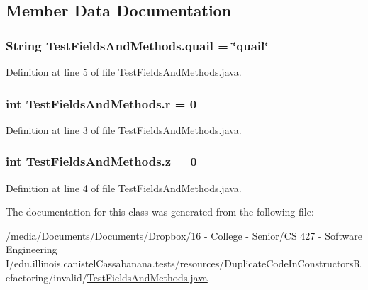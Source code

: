 \subsection{Member Data Documentation}
\hypertarget{classTestFieldsAndMethods_ac4d089475c4081e9840de7180babfb55}{
\subsubsection[{quail}]{\setlength{\rightskip}{0pt plus 5cm}String {\bf TestFieldsAndMethods.quail} = \char`\"{}quail\char`\"{}}}
\label{classTestFieldsAndMethods_ac4d089475c4081e9840de7180babfb55}


Definition at line 5 of file TestFieldsAndMethods.java.

\hypertarget{classTestFieldsAndMethods_a0d6af3a3e13ad181f3da6064c318534c}{
\subsubsection[{r}]{\setlength{\rightskip}{0pt plus 5cm}int {\bf TestFieldsAndMethods.r} = 0}}
\label{classTestFieldsAndMethods_a0d6af3a3e13ad181f3da6064c318534c}


Definition at line 3 of file TestFieldsAndMethods.java.

\hypertarget{classTestFieldsAndMethods_ab70e2271f70c0c613b1ceab5a1066594}{
\subsubsection[{z}]{\setlength{\rightskip}{0pt plus 5cm}int {\bf TestFieldsAndMethods.z} = 0}}
\label{classTestFieldsAndMethods_ab70e2271f70c0c613b1ceab5a1066594}


Definition at line 4 of file TestFieldsAndMethods.java.



The documentation for this class was generated from the following file:\begin{DoxyCompactItemize}
\item 
/media/Documents/Documents/Dropbox/16 -\/ College -\/ Senior/CS 427 -\/ Software Engineering I/edu.illinois.canistelCassabanana.tests/resources/DuplicateCodeInConstructorsRefactoring/invalid/\hyperlink{TestFieldsAndMethods_8java}{TestFieldsAndMethods.java}\end{DoxyCompactItemize}
